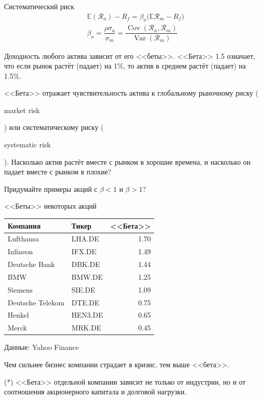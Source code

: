 \documentclass{beamer}
\newcommand{\en}[1]{\begin{otherlanguage}{english}#1\end{otherlanguage}}
\begin{document}
\begin{frame}{Систематический риск}
\justify
\begin{align*}
&\mathbb{E}(\mathcal{R}_{a}) - R_{f} =
\beta_{a}\big(
	\mathbb{E}\mathcal{R}_{m} - R_{f}		
\big) \\
&\beta_a = \dfrac{\rho\sigma_a}{\sigma_m} =
\dfrac{\operatorname{Cov}(\mathcal{R}_a, \mathcal{R}_m)}
{\operatorname{Var}(\mathcal{R}_m)}
\end{align*}

\justify
Доходность любого актива зависит от его <<беты>>. <<Бета>> 1.5 означает, что 
если рынок растёт (падает) на 1\%, то актив в среднем растёт (падает) на 1.5\%. 

\justify
<<Бета>> отражает чувствительность актива к глобальному 
рыночному риску (\en{market risk}) или систематическому риску (\en{systematic 
risk}). Насколько актив растёт вместе с рынком в хорошие времена, и насколько 
он падает вместе с рынком в плохие?

\justify
Придумайте примеры акций с $\beta<1$ и $\beta>1$?
\end{frame}



\begin{frame}{<<Беты>> некоторых акций}
\centering
\begin{tabular}{l|l|r}
Компания         & Тикер   & <<Бета>> \\ \hline
Lufthansa        & LHA.DE  & 1.70     \\
Infineon         & IFX.DE  & 1.49     \\
Deutsche Bank    & DBK.DE  & 1.44     \\
BMW              & BMW.DE  & 1.25     \\
Siemens          & SIE.DE  & 1.09     \\
Deutsche Telekom & DTE.DE  & 0.75     \\
Henkel           & HEN3.DE & 0.65    \\
Merck            & MRK.DE  & 0.45     
\end{tabular}

\justify
\centering
{\scriptsize Данные: Yahoo Finance}

\justify
Чем сильнее бизнес компании страдает в кризис, тем выше <<бета>>.

\justify
(*) <<Бета>> отдельной компании зависит не только от индустрии, но и от 
соотношения акционерного капитала и долговой нагрузки.
\end{frame}
\end{document}

